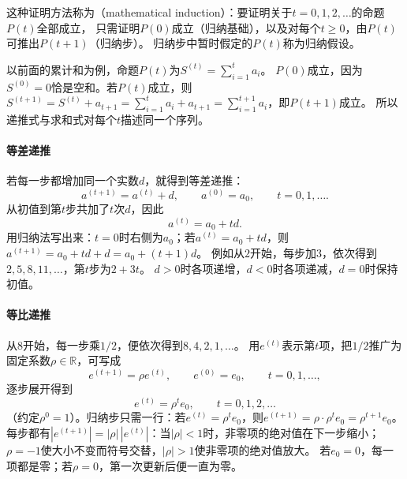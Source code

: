 这种证明方法称为（mathematical induction）：要证明关于$t=0,1,2,\ldots$的命题$P(t)$全部成立，
只需证明$P(0)$成立（归纳基础），以及对每个$t\geq0$，由$P(t)$可推出$P(t+1)$（归纳步）。
归纳步中暂时假定的$P(t)$称为归纳假设。

以前面的累计和为例，命题$P(t)$为$S^{(t)}=\sum_{i=1}^ta_i$。
$P(0)$成立，因为$S^{(0)}=0$恰是空和。若$P(t)$成立，则
$S^{(t+1)}=S^{(t)}+a_{t+1}=\sum_{i=1}^ta_i+a_{t+1}=\sum_{i=1}^{t+1}a_i$，即$P(t+1)$成立。
所以递推式与求和式对每个$t$描述同一个序列。

\paragraph{等差递推}
若每一步都增加同一个实数$d$，就得到等差递推：
\[
 a^{(t+1)}=a^{(t)}+d,\qquad a^{(0)}=a_0,\qquad t=0,1,\ldots.
\]
从初值到第$t$步共加了$t$次$d$，因此
\[
 a^{(t)}=a_0+td.
\]
用归纳法写出来：$t=0$时右侧为$a_0$；若$a^{(t)}=a_0+td$，则$a^{(t+1)}=a_0+td+d=a_0+(t+1)d$。
例如从$2$开始，每步加$3$，依次得到$2,5,8,11,\ldots$，第$t$步为$2+3t$。
$d>0$时各项递增，$d<0$时各项递减，$d=0$时保持初值。

\paragraph{等比递推}
从$8$开始，每一步乘$1/2$，便依次得到$8,4,2,1,\ldots$。
用$e^{(t)}$表示第$t$项，把$1/2$推广为固定系数$\rho\in\mathbb{R}$，可写成
\begin{equation}
  e^{(t+1)}=\rho e^{(t)},\qquad e^{(0)}=e_0,\qquad t=0,1,\ldots,
  \label{eq:prelim-geometric-recurrence}
\end{equation}
逐步展开得到
\[
  e^{(t)}=\rho^t e_0,\qquad t=0,1,2,\ldots
\]
（约定$\rho^0=1$）。归纳步只需一行：若$e^{(t)}=\rho^te_0$，则$e^{(t+1)}=\rho\cdot\rho^te_0=\rho^{t+1}e_0$。
每步都有$|e^{(t+1)}|=|\rho|\,|e^{(t)}|$：当$|\rho|<1$时，非零项的绝对值在下一步缩小；
$\rho=-1$使大小不变而符号交替，$|\rho|>1$使非零项的绝对值放大。
若$e_0=0$，每一项都是零；若$\rho=0$，第一次更新后便一直为零。


